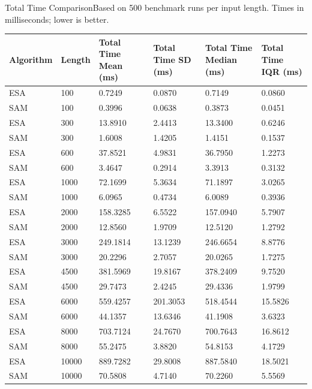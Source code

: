 \begin{benchmarktable}{Total Time Comparison}{Based on 500 benchmark runs per input length. Times in milliseconds; lower is better.}
\begin{tabularx}{\textwidth}{|X|X|X|X|X|X|}
\toprule
Algorithm & Length & Total Time Mean (ms) & Total Time SD (ms) & Total Time Median (ms) & Total Time IQR (ms) \\
\midrule
ESA & 100 & 0.7249 & 0.0870 & 0.7149 & 0.0860 \\
SAM & 100 & 0.3996 & 0.0638 & 0.3873 & 0.0451 \\
\hline
ESA & 300 & 13.8910 & 2.4413 & 13.3400 & 0.6246 \\
SAM & 300 & 1.6008 & 1.4205 & 1.4151 & 0.1537 \\
\hline
ESA & 600 & 37.8521 & 4.9831 & 36.7950 & 1.2273 \\
SAM & 600 & 3.4647 & 0.2914 & 3.3913 & 0.3132 \\
\hline
ESA & 1000 & 72.1699 & 5.3634 & 71.1897 & 3.0265 \\
SAM & 1000 & 6.0965 & 0.4734 & 6.0089 & 0.3936 \\
\hline
ESA & 2000 & 158.3285 & 6.5522 & 157.0940 & 5.7907 \\
SAM & 2000 & 12.8560 & 1.9709 & 12.5120 & 1.2792 \\
\hline
ESA & 3000 & 249.1814 & 13.1239 & 246.6654 & 8.8776 \\
SAM & 3000 & 20.2296 & 2.7057 & 20.0265 & 1.7275 \\
\hline
ESA & 4500 & 381.5969 & 19.8167 & 378.2409 & 9.7520 \\
SAM & 4500 & 29.7473 & 2.4245 & 29.4336 & 1.9799 \\
\hline
ESA & 6000 & 559.4257 & 201.3053 & 518.4544 & 15.5826 \\
SAM & 6000 & 44.1357 & 13.6346 & 41.1908 & 3.6323 \\
\hline
ESA & 8000 & 703.7124 & 24.7670 & 700.7643 & 16.8612 \\
SAM & 8000 & 55.2475 & 3.8820 & 54.8153 & 4.1729 \\
\hline
ESA & 10000 & 889.7282 & 29.8008 & 887.5840 & 18.5021 \\
SAM & 10000 & 70.5808 & 4.7140 & 70.2260 & 5.5569 \\
\bottomrule
\end{tabularx}
\end{benchmarktable}

